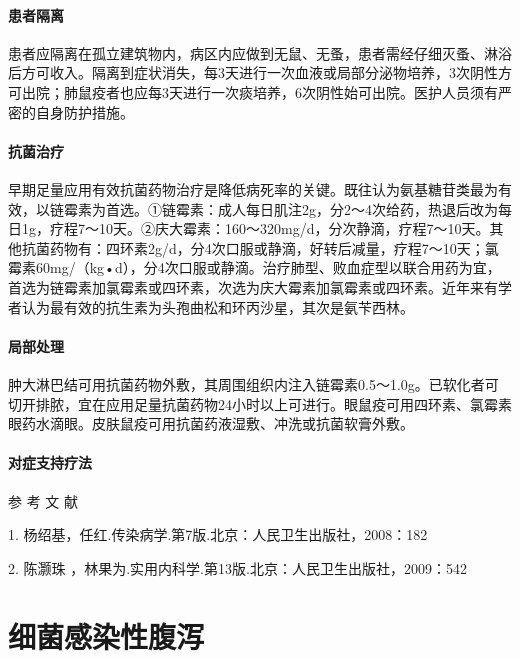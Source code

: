 \subsubsection{患者隔离}

患者应隔离在孤立建筑物内，病区内应做到无鼠、无蚤，患者需经仔细灭蚤、淋浴后方可收入。隔离到症状消失，每3天进行一次血液或局部分泌物培养，3次阴性方可出院；肺鼠疫者也应每3天进行一次痰培养，6次阴性始可出院。医护人员须有严密的自身防护措施。

\subsubsection{抗菌治疗}

早期足量应用有效抗菌药物治疗是降低病死率的关键。既往认为氨基糖苷类最为有效，以链霉素为首选。①链霉素：成人每日肌注2g，分2～4次给药，热退后改为每日1g，疗程7～10天。②庆大霉素：160～320mg/d，分次静滴，疗程7～10天。其他抗菌药物有：四环素2g/d，分4次口服或静滴，好转后减量，疗程7～10天；氯霉素60mg/（kg•d），分4次口服或静滴。治疗肺型、败血症型以联合用药为宜，首选为链霉素加氯霉素或四环素，次选为庆大霉素加氯霉素或四环素。近年来有学者认为最有效的抗生素为头孢曲松和环丙沙星，其次是氨苄西林。

\subsubsection{局部处理}

肿大淋巴结可用抗菌药物外敷，其周围组织内注入链霉素0.5～1.0g。已软化者可切开排脓，宜在应用足量抗菌药物24小时以上可进行。眼鼠疫可用四环素、氯霉素眼药水滴眼。皮肤鼠疫可用抗菌药液湿敷、冲洗或抗菌软膏外敷。

\subsubsection{对症支持疗法}

\protect\hypertarget{text00236.html}{}{}

\hypertarget{text00236.htmlux5cux23CHP7-13-4}{}
参 考 文 献

1. 杨绍基，任红.传染病学.第7版.北京：人民卫生出版社，2008：182

2. 陈灏珠 ，林果为.实用内科学.第13版.北京：人民卫生出版社，2009：542

\protect\hypertarget{text00237.html}{}{}

\chapter{细菌感染性腹泻}

